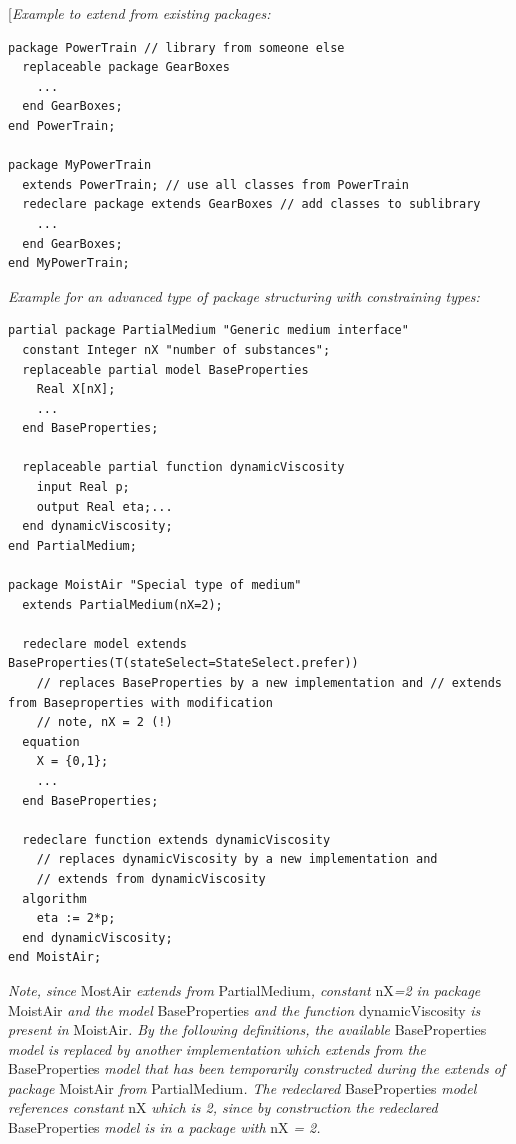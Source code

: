 \documentclass[10pt,a4paper]{report}
\begin{document}
{[}\emph{Example to extend from existing packages:}
\begin{lstlisting}[language=modelica]
package PowerTrain // library from someone else
  replaceable package GearBoxes
    ...
  end GearBoxes;
end PowerTrain;

package MyPowerTrain
  extends PowerTrain; // use all classes from PowerTrain
  redeclare package extends GearBoxes // add classes to sublibrary
    ...
  end GearBoxes;
end MyPowerTrain;
\end{lstlisting}

\emph{Example for an advanced type of package structuring with
constraining types:}
\begin{lstlisting}[language=modelica]
partial package PartialMedium "Generic medium interface"
  constant Integer nX "number of substances";
  replaceable partial model BaseProperties
    Real X[nX];
    ...
  end BaseProperties;

  replaceable partial function dynamicViscosity
    input Real p;
    output Real eta;...
  end dynamicViscosity;
end PartialMedium;

package MoistAir "Special type of medium"
  extends PartialMedium(nX=2);
  
  redeclare model extends BaseProperties(T(stateSelect=StateSelect.prefer))
    // replaces BaseProperties by a new implementation and // extends from Baseproperties with modification
    // note, nX = 2 (!)
  equation 
    X = {0,1};
    ...
  end BaseProperties;

  redeclare function extends dynamicViscosity
    // replaces dynamicViscosity by a new implementation and
    // extends from dynamicViscosity
  algorithm 
    eta := 2*p;
  end dynamicViscosity;
end MoistAir;
\end{lstlisting}

\emph{Note, since} MostAir \emph{extends from} PartialMedium\emph{,
constant} nX\emph{=2 in package} MoistAir \emph{and the model}
BaseProperties \emph{and the function} dynamicViscosity \emph{is present
in} MoistAir\emph{. By the following definitions, the available}
BaseProperties \emph{model is replaced by another implementation which
extends from the} BaseProperties \emph{model that has been temporarily
constructed during the extends of package} MoistAir \emph{from}
PartialMedium\emph{. The redeclared} BaseProperties \emph{model
references constant} nX \emph{which is 2, since by construction the
redeclared} BaseProperties \emph{model is in a package with} nX \emph{=
2.}
\end{document}
